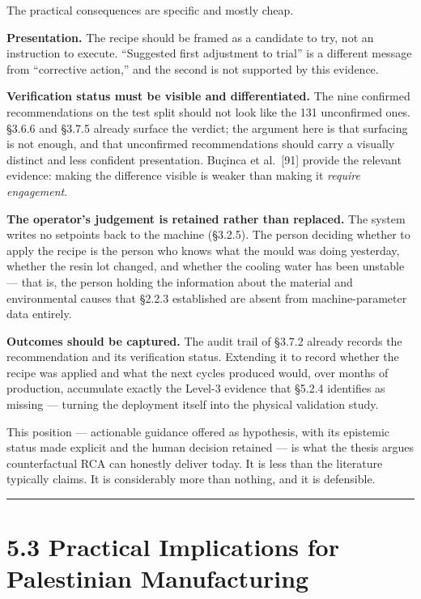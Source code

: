 The practical consequences are specific and mostly cheap.

\textbf{Presentation.} The recipe should be framed as a candidate to try, not an instruction to execute. ``Suggested first adjustment to trial'' is a different message from ``corrective action,'' and the second is not supported by this evidence.

\textbf{Verification status must be visible and differentiated.} The nine confirmed recommendations on the test split should not look like the 131 unconfirmed ones. §3.6.6 and §3.7.5 already surface the verdict; the argument here is that surfacing is not enough, and that unconfirmed recommendations should carry a visually distinct and less confident presentation. Buçinca et al.~{[}91{]} provide the relevant evidence: making the difference visible is weaker than making it \emph{require engagement}.

\textbf{The operator's judgement is retained rather than replaced.} The system writes no setpoints back to the machine (§3.2.5). The person deciding whether to apply the recipe is the person who knows what the mould was doing yesterday, whether the resin lot changed, and whether the cooling water has been unstable --- that is, the person holding the information about the material and environmental causes that §2.2.3 established are absent from machine-parameter data entirely.

\textbf{Outcomes should be captured.} The audit trail of §3.7.2 already records the recommendation and its verification status. Extending it to record whether the recipe was applied and what the next cycles produced would, over months of production, accumulate exactly the Level-3 evidence that §5.2.4 identifies as missing --- turning the deployment itself into the physical validation study.

This position --- actionable guidance offered as hypothesis, with its epistemic status made explicit and the human decision retained --- is what the thesis argues counterfactual RCA can honestly deliver today. It is less than the literature typically claims. It is considerably more than nothing, and it is defensible.

\begin{center}\rule{0.5\linewidth}{0.5pt}\end{center}

\hypertarget{practical-implications-for-palestinian-manufacturing}{%
\section{5.3 Practical Implications for Palestinian Manufacturing}\label{practical-implications-for-palestinian-manufacturing}}

